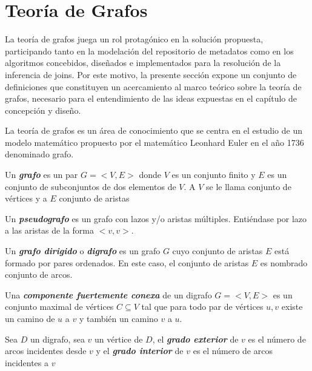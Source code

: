 \section{Teor\'ia de Grafos}\label{section:graphs}

La teoría de grafos juega un rol protagónico en la solución propuesta, participando tanto 
en la modelación del repositorio de metadatos como en los algoritmos concebidos, diseñados e 
implementados para la resolución de la inferencia de joins. Por este motivo, la presente sección 
expone un conjunto de definiciones que constituyen un acercamiento al marco teórico sobre 
la teoría de grafos, necesario para el entendimiento de las ideas expuestas en el capítulo 
de concepción y diseño.

La teoría de grafos es un \'area de conocimiento que se centra en el estudio de un modelo matemático 
propuesto por el matemático Leonhard Euler en el año 1736 denominado grafo\cite{estrada2012structure}.

\begin{definition}
    Un \textbf{\textit{grafo}} es un par $G = <V, E>$ donde $V$ es un conjunto finito y $E$ es un 
    conjunto de subconjuntos de dos elementos de $V$. A $V$ se le llama conjunto de v\'ertices y 
    a $E$ conjunto de aristas
\end{definition}

\begin{definition}
    Un \textbf{\textit{pseudografo}} es un grafo con lazos y/o aristas m\'ultiples. Entiéndase por 
    lazo a las aristas de la forma $<v,v>$.
\end{definition}

\begin{definition}
    Un \textbf{\textit{grafo dirigido}} o \textbf{\textit{digrafo}} es un grafo $G$ cuyo conjunto de 
    aristas $E$ est\'a formado por pares ordenados. En este caso, el conjunto de aristas $E$ es nombrado 
    conjunto de arcos.
\end{definition}

\begin{definition}
    Una \textbf{\textit{componente fuertemente conexa}} de un digrafo $G=<V,E>$ es un conjunto maximal 
    de v\'ertices $C \subseteq V$ tal que para todo par de v\'ertices $u,v$ existe un camino de $u$ 
    a $v$ y tambi\'en un camino $v$ a $u$. 
\end{definition}

\begin{definition}
    Sea $D$ un digrafo, sea $v$ un v\'ertice de $D$, el \textbf{\textit{grado exterior}} de $v$ es el 
    n\'umero de arcos incidentes desde $v$ y el \textbf{\textit{grado interior}} de $v$ es el n\'umero 
    de arcos incidentes a $v$
\end{definition}

